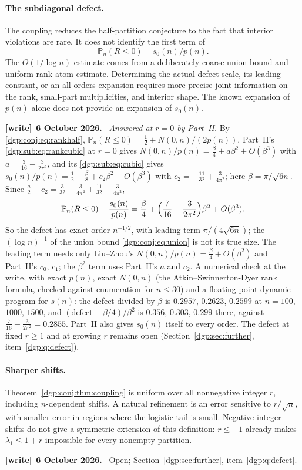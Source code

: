 \documentclass[11pt,letterpaper]{article}
\numberwithin{equation}{section}
\theoremstyle{remark}\newtheorem{remark}[theorem]{Remark}
\newcommand{\PP}{\mathbb P}
\newenvironment{writenote}[1][]{\par\smallskip\begingroup\small
 \noindent\textbf{[write]}\if\relax\detokenize{#1}\relax\else~\textbf{#1.}\fi\ }%
 {\par\endgroup\smallskip}
\begin{document}
\paragraph{The subdiagonal defect.}
The coupling reduces the half-partition conjecture to the fact that
interior violations are rare. It does not identify the first term of
\[
 \PP_n(R\leq0)-s_0(n)/p(n).
\]
The $O(1/\log n)$ estimate comes from a deliberately coarse union
bound and uniform rank atom estimate. Determining the actual defect
scale, its leading constant, or an all-orders expansion requires
more precise joint information on the rank, small-part
multiplicities, and interior shape. The known expansion of $p(n)$
alone does not provide an expansion of $s_0(n)$.
\begin{writenote}[6 October 2026]
\emph{Answered at $r=0$ by Part~II.} By \eqref{dgp:conj:eq:rankhalf}, $\PP_n(R\le0)=\frac12+N(0,n)/(2p(n))$. Part~II's \eqref{dgp:sub:eq:rankcubic} at $r=0$ gives $N(0,n)/p(n)=\frac\beta4+a\beta^2+O(\beta^3)$ with $a=\frac3{16}-\frac3{2\pi^2}$, and its \eqref{dgp:sub:eq:cubic} gives $s_0(n)/p(n)=\frac12-\frac\beta8+c_2\beta^2+O(\beta^3)$ with $c_2=-\frac{11}{32}+\frac3{4\pi^2}$; here $\beta=\pi/\sqrt{6n}$. Since $\frac a2-c_2=\frac3{32}-\frac3{4\pi^2}+\frac{11}{32}-\frac3{4\pi^2}$,
\begin{equation}\label{dgp:conj:eq:defect}
 \PP_n(R\le0)-\frac{s_0(n)}{p(n)}=\frac\beta4+\Bigl(\frac7{16}-\frac3{2\pi^2}\Bigr)\beta^2+O(\beta^3).
\end{equation}
So the defect has exact order $n^{-1/2}$, with leading term $\pi/(4\sqrt{6n})$; the $(\log n)^{-1}$ of the union bound \eqref{dgp:conj:eq:union} is not its true size. The leading term needs only Liu--Zhou's $N(0,n)/p(n)=\frac\beta4+O(\beta^2)$ and Part~II's $c_0$, $c_1$; the $\beta^2$ term uses Part~II's $a$ and $c_2$. A numerical check at the write, with exact $p(n)$, exact $N(0,n)$ (the Atkin--Swinnerton-Dyer rank formula, checked against enumeration for $n\le30$) and a floating-point dynamic program for $s(n)$: the defect divided by $\beta$ is $0.2957$, $0.2623$, $0.2599$ at $n=100$, $1000$, $1500$, and $(\text{defect}-\beta/4)/\beta^2$ is $0.356$, $0.303$, $0.299$ there, against $\frac7{16}-\frac3{2\pi^2}=0.2855$. Part~II also gives $s_0(n)$ itself to every order. The defect at fixed $r\ge1$ and at growing $r$ remains open (Section~\ref{dgp:sec:further}, item~\ref{dgp:q:defect}).
\end{writenote}

\paragraph{Sharper shifts.}
Theorem~\ref{dgp:conj:thm:coupling} is uniform over all nonnegative integer
$r$, including $n$-dependent shifts. A natural refinement is an
error sensitive to $r/\sqrt n$, with smaller error in regions where
the logistic tail is small. Negative integer shifts do not give a
symmetric extension of this definition: $r\leq-1$ already makes
$\lambda_1\leq1+r$ impossible for every nonempty partition.
\begin{writenote}[6 October 2026]
Open; Section~\ref{dgp:sec:further}, item~\ref{dgp:q:defect}.
\end{writenote}
\end{document}
